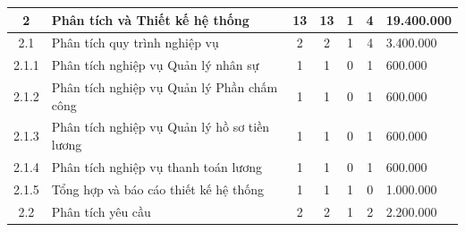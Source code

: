 \begin{longtable}{|c|p{3cm}|c|c|c|c|p{3cm}|}
    2                               & Phân tích và Thiết kế hệ thống                                & 13                                             & 13                                              & 1                                                               & 4                  & 19.400.000 \\ \hline
    2.1                             & Phân tích quy trình nghiệp vụ                                 & 2                                              & 2                                               & 1                                                               & 4                  & 3.400.000  \\ \hline
    2.1.1                           & Phân tích nghiệp vụ Quản lý nhân sự                           & 1                                              & 1                                               & 0                                                               & 1                  & 600.000    \\ \hline
    2.1.2                           & Phân tích nghiệp vụ Quản lý Phần chấm công                    & 1                                              & 1                                               & 0                                                               & 1                  & 600.000    \\ \hline
    2.1.3                           & Phân tích nghiệp vụ Quản lý hồ sơ tiền lương                  & 1                                              & 1                                               & 0                                                               & 1                  & 600.000    \\ \hline
    2.1.4                           & Phân tích nghiệp vụ thanh toán lương                          & 1                                              & 1                                               & 0                                                               & 1                  & 600.000    \\ \hline
    2.1.5                           & Tổng hợp và báo cáo thiết kế hệ thống                         & 1                                              & 1                                               & 1                                                               & 0                  & 1.000.000  \\ \hline
    2.2                             & Phân tích yêu cầu                                             & 2                                              & 2                                               & 1                                                               & 2                  & 2.200.000  \\ \hline

\end{longtable}
